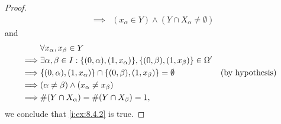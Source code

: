 \begin{proof}
\begin{align*}
    \implies & (x_\alpha \in Y) \land (Y \cap X_{\alpha} \neq \emptyset)
  \end{align*}
  and
  \begin{align*}
             & \forall x_{\alpha}, x_{\beta} \in Y                                                                                                        \\
    \implies & \exists \alpha, \beta \in I : \set{(0, \alpha), (1, x_{\alpha})}, \set{(0, \beta), (1, x_{\beta})} \in \Omega'                             \\
    \implies & \set{(0, \alpha), (1, x_{\alpha})} \cap \set{(0, \beta), (1, x_{\beta})} = \emptyset                           &  & \text{(by hypothesis)} \\
    \implies & (\alpha \neq \beta) \land (x_{\alpha} \neq x_{\beta})                                                                                      \\
    \implies & \#(Y \cap X_{\alpha}) = \#(Y \cap X_{\beta}) = 1,
  \end{align*}
  we conclude that \cref{i:ex:8.4.2} is true.
\end{proof}
